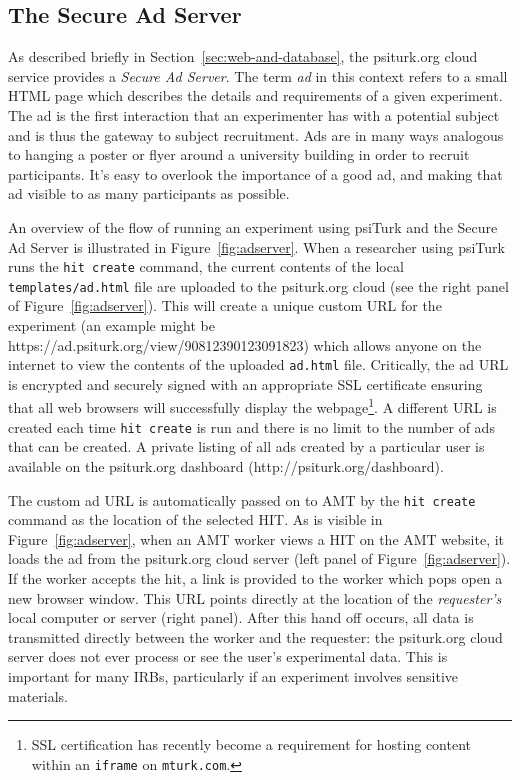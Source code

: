 \documentclass[twocolumn]{svjour3}          %
\newcommand{\psiturk}[0]{\textsf{psiTurk}}
\begin{document}
\subsection{The Secure Ad Server}
\label{sec:adserver}

As described briefly in Section~\ref{sec:web-and-database}, the \textsf{psiturk.org}
cloud service provides a \emph{Secure Ad Server}.  The term \emph{ad} in this context
refers to a small HTML page which describes the details and requirements of a
given experiment.  The ad is the first interaction that an experimenter has
with a potential subject and is thus the gateway to subject recruitment. Ads
are in many ways analogous to hanging a poster or flyer around a university
building in order to recruit participants. It's easy to overlook the importance
of a good ad, and making that ad visible to as many participants as possible.

An overview of the flow of running an experiment using
\psiturk{} and the Secure Ad Server is illustrated in
Figure~\ref{fig:adserver}.  When a researcher using \psiturk{}
runs the \texttt{hit create} command, the current contents of the local
\texttt{templates/ad.html} file are uploaded to the \textsf{psiturk.org} cloud (see
the right panel of Figure~\ref{fig:adserver}).
This will create a unique custom URL for the experiment (an example might be
\textsf{https://ad.psiturk.org/view/90812390123091823}) which
allows anyone on the internet to view the contents of the uploaded \texttt{ad.html}
file.  Critically, the ad URL is encrypted and
securely signed with an appropriate SSL certificate ensuring that all
web browsers will successfully display the webpage\footnote{SSL certification has recently become a requirement for hosting content within an \texttt{iframe} on \texttt{mturk.com}.}. A different URL is created each time \texttt{hit create}
is run and there is no limit to the number of ads that can be created.  A private listing of all ads created by a particular user is available on the \textsf{psiturk.org} dashboard (\textsf{http://psiturk.org/dashboard}).

The custom ad URL is automatically passed
on to AMT by the \texttt{hit create} command as the location of
the selected HIT.  As is visible in Figure~\ref{fig:adserver},
when an AMT worker views a HIT on the AMT
website, it loads the ad from the \textsf{psiturk.org} cloud server (left panel of Figure~\ref{fig:adserver}).  If the worker accepts
the hit, a link is provided to the worker which pops open a new browser
window.  This URL points directly at the location of the \emph{requester's} local computer
or server (right panel).  After this hand off occurs, all data is transmitted directly between the worker
and the requester: the \textsf{psiturk.org} cloud server does not ever
process or see the user's experimental data.  This is important for many IRBs,
particularly if an experiment involves sensitive materials.
\end{document}
